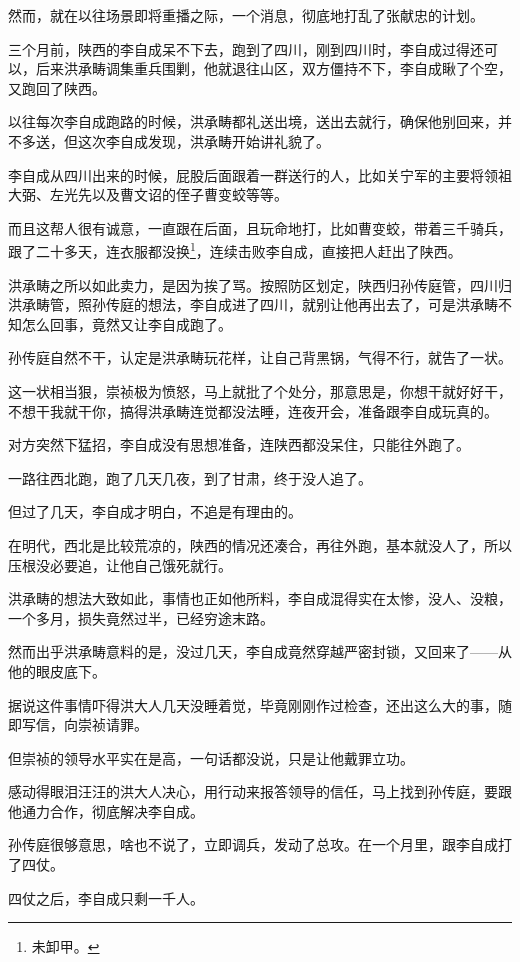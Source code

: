 \begin{multicols}{\theparacolNo}
		然而，就在以往场景即将重播之际，一个消息，彻底地打乱了张献忠的计划。

		三个月前，陕西的李自成呆不下去，跑到了四川，刚到四川时，李自成过得还可以，后来洪承畴调集重兵围剿，他就退往山区，双方僵持不下，李自成瞅了个空，又跑回了陕西。

		以往每次李自成跑路的时候，洪承畴都礼送出境，送出去就行，确保他别回来，并不多送，但这次李自成发现，洪承畴开始讲礼貌了。

		李自成从四川出来的时候，屁股后面跟着一群送行的人，比如关宁军的主要将领祖大弼、左光先以及曹文诏的侄子曹变蛟等等。

		而且这帮人很有诚意，一直跟在后面，且玩命地打，比如曹变蛟，带着三千骑兵，跟了二十多天，连衣服都没换\footnote{未卸甲。}，连续击败李自成，直接把人赶出了陕西。

		洪承畴之所以如此卖力，是因为挨了骂。按照防区划定，陕西归孙传庭管，四川归洪承畴管，照孙传庭的想法，李自成进了四川，就别让他再出去了，可是洪承畴不知怎么回事，竟然又让李自成跑了。

		孙传庭自然不干，认定是洪承畴玩花样，让自己背黑锅，气得不行，就告了一状。

		这一状相当狠，崇祯极为愤怒，马上就批了个处分，那意思是，你想干就好好干，不想干我就干你，搞得洪承畴连觉都没法睡，连夜开会，准备跟李自成玩真的。

		对方突然下猛招，李自成没有思想准备，连陕西都没呆住，只能往外跑了。

		一路往西北跑，跑了几天几夜，到了甘肃，终于没人追了。

		但过了几天，李自成才明白，不追是有理由的。

		在明代，西北是比较荒凉的，陕西的情况还凑合，再往外跑，基本就没人了，所以压根没必要追，让他自己饿死就行。

		洪承畴的想法大致如此，事情也正如他所料，李自成混得实在太惨，没人、没粮，一个多月，损失竟然过半，已经穷途末路。

		然而出乎洪承畴意料的是，没过几天，李自成竟然穿越严密封锁，又回来了——从他的眼皮底下。

		据说这件事情吓得洪大人几天没睡着觉，毕竟刚刚作过检查，还出这么大的事，随即写信，向崇祯请罪。

		但崇祯的领导水平实在是高，一句话都没说，只是让他戴罪立功。

		感动得眼泪汪汪的洪大人决心，用行动来报答领导的信任，马上找到孙传庭，要跟他通力合作，彻底解决李自成。

		孙传庭很够意思，啥也不说了，立即调兵，发动了总攻。在一个月里，跟李自成打了四仗。

		四仗之后，李自成只剩一千人。


\end{multicols}
